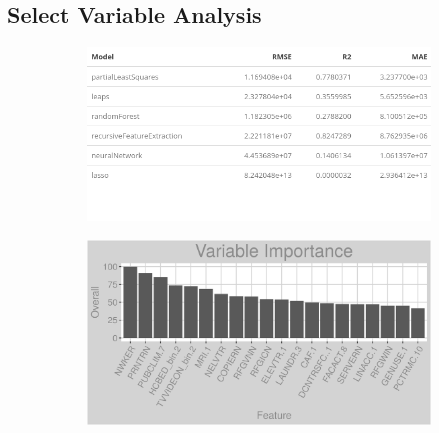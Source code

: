 \subsection{Select Variable Analysis}
\label{appendix:electricity:sva}
\begin{figure}[h]
\centering
\begin{subfigure}{0.8\textwidth}
\centering
\includegraphics[width=.99\textwidth, height=0.35\textheight]{Images/electricity_fe_summary.png}
\end{subfigure}
\begin{subfigure}{1\textwidth}
\centering
\includegraphics[width=.99\textwidth, height=0.35\textheight]{Images/electricity_all_vars.png}
\end{subfigure}
\end{figure}
\FloatBarrier
\newpage
